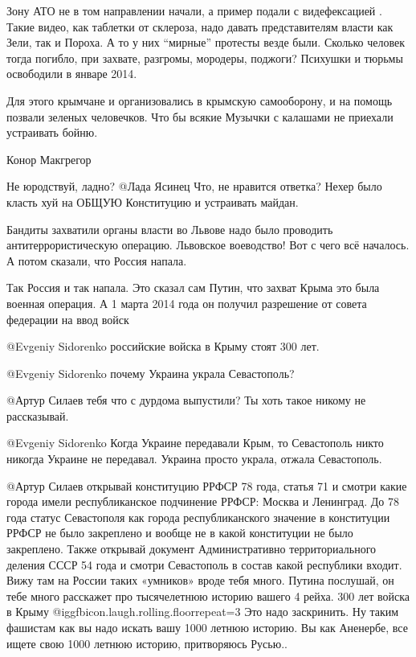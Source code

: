 \begin{multicols}{2}
Зону АТО не в том направлении начали, а пример подали с видефексацией .
Такие видео, как таблетки от склероза, надо давать  представителям власти как Зели, так и Пороха. А то у них \enquote{мирные} протесты везде были.
Сколько человек тогда погибло, при захвате,  разгромы, мородеры, поджоги? Психушки и тюрьмы освободили в январе 2014.


Для этого крымчане и организовались в крымскую самооборону, и на помощь позвали
зеленых человечков. Что бы всякие Музычки с калашами не приехали устраивать
бойню. 

\begin{itemize} %
Конор Макгрегор

Не юродствуй, ладно?
 @Лада Ясинец  Что, не нравится ответка? Нехер было класть хуй на ОБЩУЮ Конституцию и устраивать майдан. 
\end{itemize} %

Бандиты захватили органы власти во Львове надо было проводить антитеррористическую операцию.
Львовское воеводство!
Вот с чего всё началось. А потом сказали, что Россия напала. 

\begin{itemize} %

Так Россия и так напала. Это сказал сам Путин, что захват Крыма это была
военная операция. А 1 марта 2014 года он получил разрешение от совета федерации
на ввод войск


 @Evgeniy Sidorenko  российские войска в Крыму стоят 300 лет.

 @Evgeniy Sidorenko  почему Украина украла Севастополь?

 @Артур Силаев  тебя что с дурдома выпустили? Ты хоть такое никому не рассказывай.

 @Evgeniy Sidorenko  Когда Украине передавали Крым, то Севастополь никто никогда Украине не передавал. Украина просто украла, отжала Севастополь. 


@Артур Силаев  открывай конституцию РРФСР 78 года, статья 71 и смотри какие
города имели республиканское подчинение РРФСР: Москва и Ленинград. До 78 года
статус Севастополя как города республиканского значение в конституции РРФСР не
было закреплено и вообще не в какой конституции не было закреплено. Также
открывай документ Административно территориального деления СССР 54 года и
смотри Севастополь в состав какой республики входит. Вижу там на России таких
«умников» вроде тебя много. Путина послушай, он тебе много расскажет про
тысячелетнюю историю вашего 4 рейха. 300 лет войска в Крыму  @igg{fbicon.laugh.rolling.floor}{repeat=3}  Это надо
заскринить. Ну таким фашистам как вы надо искать вашу 1000 летнюю историю. Вы
как Аненербе, все ищете свою 1000 летнюю историю, притворяюсь Русью..


\end{itemize}
\end{multicols}
